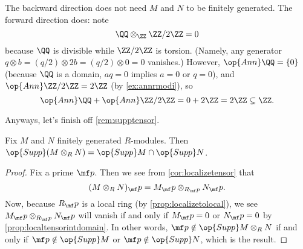 \begin{remark}[Nir]
	The backward direction does not need $M$ and $N$ to be finitely generated. The forward direction does: note
	\[\QQ\otimes_\ZZ\ZZ/2\ZZ=0\]
	because $\QQ$ is divisible while $\ZZ/2\ZZ$ is torsion. (Namely, any generator $q\otimes b=(q/2)\otimes2b=(q/2)\otimes0=0$ vanishes.) However, $\op{Ann}\QQ=\{0\}$ (because $\QQ$ is a domain, $aq=0$ implies $a=0$ or $q=0$), and $\op{Ann}\ZZ/2\ZZ=2\ZZ$ (by \autoref{ex:annrmodi}), so
	\[\op{Ann}\QQ+\op{Ann}\ZZ/2\ZZ=0+2\ZZ=2\ZZ\subsetneq\ZZ.\]
\end{remark}
Anyways, let's finish off \autoref{rem:supptensor}.
\begin{corollary} \label{cor:supptensor}
	Fix $M$ and $N$ finitely generated $R$-modules. Then $\op{Supp}(M\otimes_RN)=\op{Supp}M\cap\op{Supp}N$.
\end{corollary}
\begin{proof}
	Fix a prime $\mf p$. Then we see from \autoref{cor:localizetensor} that
	\[(M\otimes_RN)_\mf p=M_\mf p\otimes_{R_\mf p}N_\mf p.\]
	Now, because $R_\mf p$ is a local ring (by \autoref{prop:localizetolocal}), we see $M_\mf p\otimes_{R_\mf p}N_\mf p$ will vanish if and only if $M_\mf p=0$ or $N_\mf p=0$ by \autoref{prop:localtensorintdomain}. In other words, $\mf p\notin\op{Supp}M\otimes_RN$ if and only if $\mf p\notin\op{Supp}M$ or $\mf p\notin\op{Supp}N$, which is the result.
\end{proof}

